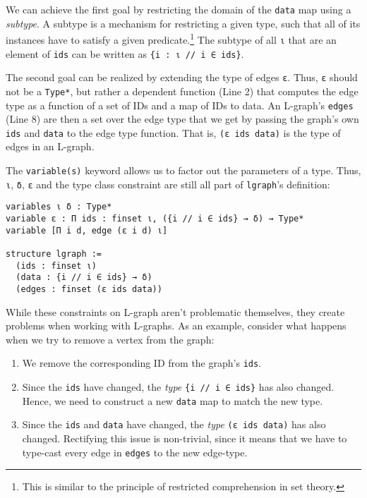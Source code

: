 \noindent We can achieve the first goal by restricting the domain of the \lstinline{data} map using a \emph{subtype}.
A subtype is a mechanism for restricting a given type, such that all of its instances have to satisfy a given predicate.\footnote{
  This is similar to the principle of restricted comprehension in set theory.
} 
The subtype of all \lstinline{ι} that are an element of \lstinline{ids} can be written as \lstinline|{i : ι // i ∈ ids}|.

The second goal can be realized by extending the type of edges \lstinline{ε}.
Thus, \lstinline{ε} should not be a \verb|Type*|, but rather a dependent function (Line 2) that computes the edge type as a function of a set of IDs and a map of IDs to data.
An L-graph's \lstinline{edges} (Line 8) are then a set over the edge type that we get by passing the graph's own \lstinline{ids} and \lstinline{data} to the edge type function.
That is, \lstinline{(ε ids data)} is the type of edges in an L-graph.

The \verb|variable(s)| keyword allows us to factor out the parameters of a type. 
Thus, \lstinline{ι}, \lstinline{δ}, \lstinline{ε} and the type class constraint are still all part of \lstinline{lgraph}'s definition:

\lstset{numbers=left, xleftmargin=1.5em}
\begin{lstlisting}
variables ι δ : Type*
variable ε : Π ids : finset ι, ({i // i ∈ ids} → δ) → Type*
variable [Π i d, edge (ε i d) ι]

structure lgraph :=
  (ids : finset ι)
  (data : {i // i ∈ ids} → δ)
  (edges : finset (ε ids data))
\end{lstlisting}
\lstset{numbers=none, xleftmargin=0em}

\noindent While these constraints on L-graph aren't problematic themselves, they create problems when working with L-graphs.
As an example, consider what happens when we try to remove a vertex from the graph:

\begin{enumerate}
  \item We remove the corresponding ID from the graph's \lstinline{ids}.
  \item Since the \lstinline{ids} have changed, the \emph{type} \verb|{i // i ∈ ids}| has also changed. 
  Hence, we need to construct a new \lstinline{data} map to match the new type.
  \item Since the \lstinline{ids} and \lstinline{data} have changed, the \emph{type} \lstinline{(ε ids data)} has also changed.
  Rectifying this issue is non-trivial, since it means that we have to type-cast every edge in \lstinline{edges} to the new edge-type.
\end{enumerate}


